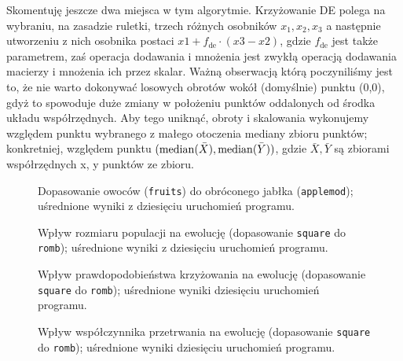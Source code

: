 \documentclass[a4paper,12pt,leqno]{article}
\begin{document}
Skomentuję jeszcze dwa miejsca w tym algorytmie.
Krzyżowanie DE polega na wybraniu, na zasadzie ruletki, trzech różnych osobników $x_1, x_2, x_3$ a następnie utworzeniu z nich osobnika postaci
$x1 + f_\text{de}\cdot(x3-x2)$, gdzie $f_\text{de}$ jest także parametrem, zaś operacja dodawania i mnożenia jest zwykłą operacją dodawania macierzy 
i mnożenia ich przez skalar.
Ważną obserwacją którą poczyniliśmy jest to, że nie warto dokonywać losowych obrotów wokół (domyślnie) punktu (0,0), 
gdyż to spowoduje duże zmiany w położeniu punktów oddalonych od środka układu współrzędnych. Aby tego uniknąć, obroty i skalowania wykonujemy względem punktu wybranego z małego otoczenia
mediany zbioru punktów; konkretniej, względem punktu $(\mathrm{median}(\bar{X}), \mathrm{median}(\bar{Y}))$, gdzie $\bar{X}, \bar{Y}$ są zbiorami współrzędnych x, y punktów ze zbioru.

\begin{figure}\centering
\footnotesize\vspace{-2em}
\normalsize\caption{Dopasowanie owoców (\texttt{fruits}) do obróconego jabłka (\texttt{applemod}); uśrednione wyniki z dziesięciu uruchomień programu.}
\end{figure} 

\begin{figure}\centering
\footnotesize\vspace{-2em}
\normalsize\caption{Wpływ rozmiaru populacji na ewolucję (dopasowanie \texttt{square} do \texttt{romb}); uśrednione wyniki z dziesięciu uruchomień programu.}
\end{figure}
\begin{figure}\centering
\footnotesize\vspace{-2em}
\normalsize\caption{Wpływ prawdopodobieństwa krzyżowania na ewolucję (dopasowanie \texttt{square} do \texttt{romb}); uśrednione wyniki dziesięciu uruchomień programu.}
\end{figure}
\begin{figure}\centering
\footnotesize\vspace{-2em}
\normalsize\caption{Wpływ współczynnika przetrwania na ewolucję (dopasowanie \texttt{square} do \texttt{romb}); uśrednione wyniki dziesięciu uruchomień programu.}
\end{figure}
\end{document}
